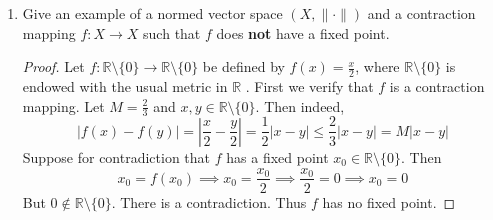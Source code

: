 \documentclass{article}
\theoremstyle{plain} %
\numberwithin{thm}{section} %
\theoremstyle{definition}
\begin{document}
\begin{enumerate}[label=(\alph*)]
\begin{proof}
                Suppose \((x_n) \to x_0\). Letting \(\varepsilon > 0\), there exists an \(N^\prime > 0\) such that \(d(f^n(x), x_0) < \varepsilon\) for all \(n \geq N^\prime\). Let \(N = N^\prime + 1\).  For all \(n \geq N\),
                \[
                    d(f^n(x), f(x_0)) \leq Md(f^{n-1} (x), x_0)
                \]
                \(n-1 \geq N^\prime\) so
                \[
                    Md(f^{n-1} (x), x_0) < \varepsilon
                \]
                We have shown that \((x_0)\) converges to both \(x_0\) and \(f(x_0)\). By the uniqueness of limits, we have \(x_0 = f(x_0)\).

                To show uniqueness, suppose that \(x_0, x_1\) are two distinct fixed points of \(f\). Then using the definition of contraction mapping, we have that
                \[
                    d(f(x_0), f(x_1)) \leq Md(x_0, x_1)
                \]
                but because \(x_0, x_1\) are fixed points, this implies that
                \[
                    d(x_0, x_1) \leq Md(x_0, x_1)
                \]
                Since they are distinct, \(d(x_0, x_1) \neq 0\), so
                \[
                    1 \leq M
                \]
                which is a contradiction. Thus there is only one fixed point.

            \end{proof}

            \item Give an example of a normed vector space $(X,\|\cdot\|)$ and a contraction mapping $f:X\rightarrow X$ such that $f$ does \textbf{not} have a fixed point.
            
            \begin{proof}
                Let \(f: \mathbb{R}\setminus \{0\} \to \mathbb{R}\setminus \{0\}\) be defined by \(f(x) = \frac{x}{2}\), where \(\mathbb{R}\setminus \{0\}\) is endowed with the usual metric in \(\mathbb{R}\) . First we verify that \(f\) is a contraction mapping. Let \(M = \frac{2}{3}\) and \(x,y \in \mathbb{R}\setminus\{0\}\). Then indeed,
                \[
                    \left|f(x)-f(y)\right| = \left|\frac{x}{2} - \frac{y}{2}\right| = \frac{1}{2} \left|x - y\right| \leq \frac{2}{3} \left|x-y\right| = M\left|x-y\right|
                \]
                Suppose for contradiction that \(f\) has a fixed point \(x_0 \in \mathbb{R}\setminus\{0\}\).  Then
                \[
                    x_0 = f(x_0) \implies x_0 = \frac{x_0}{2} \implies \frac{x_0}{2} = 0 \implies x_0 = 0
                \]
                But \(0 \notin \mathbb{R}\setminus\{0\}\). There is a contradiction. Thus \(f\) has no fixed point.

            \end{proof}
        \end{enumerate}
\end{document}
